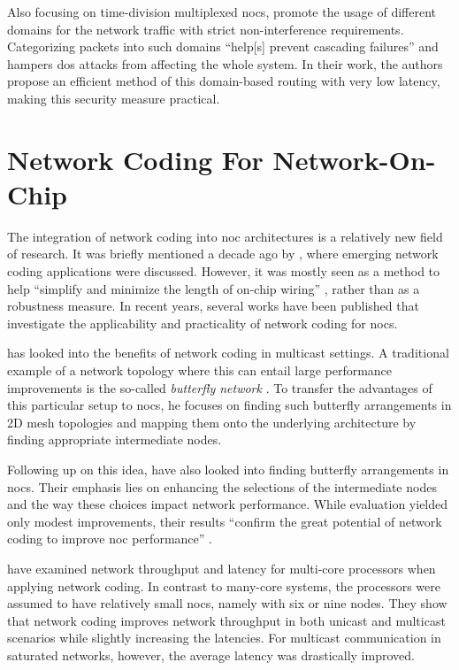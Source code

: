 Also focusing on time-division multiplexed \glspl{noc}, \citeauthor{wassel13surfnoc} \cite{wassel13surfnoc} promote the usage of different domains for
the network traffic with strict non-interference requirements. Categorizing packets into such domains \enquote{help[s] prevent cascading failures}
\cite[1]{wassel13surfnoc} and hampers \gls{dos} attacks from affecting the whole system. In their work, the authors propose an efficient method of
this domain-based routing with very low latency, making this security measure practical.

\section{Network Coding For Network-On-Chip}\label{sec:ncfornoc}
The integration of network coding into \gls{noc} architectures is a relatively new field of research. It was briefly mentioned a decade ago by
\citeauthor{fragouli08ncapplications} \cite{fragouli08ncapplications}, where emerging network coding applications were discussed. However, it was
mostly seen as a method to help \enquote{simplify and minimize the length of on-chip wiring} \cite[260]{fragouli08ncapplications}, rather than as a
robustness measure. In recent years, several works have been published that investigate the applicability and practicality of network coding for
\glspl{noc}.

\citeauthor{indrusiak11ncfornocs} \cite{indrusiak11ncfornocs} has looked into the benefits of network coding in multicast settings. A traditional
example of a network topology where this can entail large performance improvements is the so-called \textit{butterfly network} \cites(cf.)(){ahlswede00networkflow}{li03linearnc}.
To transfer the advantages of this particular setup to \glspl{noc}, he focuses on finding such butterfly arrangements in 2D mesh topologies and
mapping them onto the underlying architecture by finding appropriate intermediate nodes.

Following up on this idea, \citeauthor{shalaby12nodeselection} \cite{shalaby12nodeselection} have also looked into finding butterfly arrangements in
\glspl{noc}. Their emphasis lies on enhancing the selections of the intermediate nodes and the way these choices impact network performance. While
evaluation yielded only modest improvements, their results \enquote{confirm the great potential of network coding to improve \gls{noc}
performance} \cite[5]{shalaby12nodeselection}.

\citeauthor{duongba11ncinmulticore} \cite{duongba11ncinmulticore} have examined network throughput and latency for multi-core processors when applying
network coding. In contrast to many-core systems, the processors were assumed to have relatively small \glspl{noc}, namely with six or nine nodes.
They show that network coding improves network throughput in both unicast and multicast scenarios while slightly increasing the latencies. For
multicast communication in saturated networks, however, the average latency was drastically improved.

